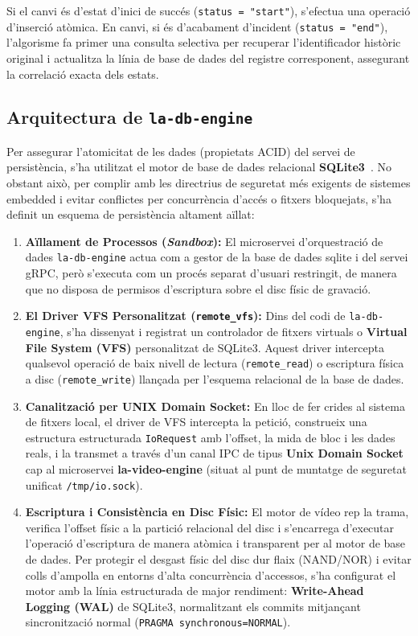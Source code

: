 Si el canvi és d'estat d'inici de succés (\texttt{status = "start"}), s'efectua una operació d'inserció atòmica. En canvi, si és d'acabament d'incident (\texttt{status = "end"}), l'algorisme fa primer una consulta selectiva per recuperar l'identificador històric original i actualitza la línia de base de dades del registre corresponent, assegurant la correlació exacta dels estats.

\subsection{Arquitectura de \texttt{la-db-engine}}
Per assegurar l'atomicitat de les dades (propietats ACID) del servei de persistència, s'ha utilitzat el motor de base de dades relacional \textbf{SQLite3}~\cite{sqlite_spec}. No obstant això, per complir amb les directrius de seguretat més exigents de sistemes embedded i evitar conflictes per concurrència d'accés o fitxers bloquejats, s'ha definit un esquema de persistència altament aïllat:

\begin{enumerate}
  \item \textbf{Aïllament de Processos (\textit{Sandbox}):} El microservei d'orquestració de dades \texttt{la-db-engine} actua com a gestor de la base de dades sqlite i del servei gRPC, però s'executa com un procés separat d'usuari restringit, de manera que no disposa de permisos d'escriptura sobre el disc físic de gravació.
  \item {\sloppy\textbf{El Driver VFS Personalitzat (\texttt{remote\_vfs}):} Dins del codi de \texttt{la-db-engine}, s'ha dissenyat i registrat un controlador de fitxers virtuals o \textbf{Virtual File System (VFS)} personalitzat de SQLite3. Aquest driver intercepta qualsevol operació de baix nivell de lectura (\texttt{remote\_read}) o escriptura física a disc (\texttt{remote\_write}) llançada per l'esquema relacional de la base de dades.\par}
  \item \textbf{Canalització per UNIX Domain Socket:} En lloc de fer crides al sistema de fitxers local, el driver de VFS intercepta la petició, construeix una estructura estructurada \texttt{IoRequest} amb l'offset, la mida de bloc i les dades reals, i la transmet a través d'un canal IPC de tipus \textbf{Unix Domain Socket} cap al microservei \textbf{la-video-engine} (situat al punt de muntatge de seguretat unificat \texttt{/tmp/io.sock}).
  \item \textbf{Escriptura i Consistència en Disc Físic:} El motor de vídeo rep la trama, verifica l'offset físic a la partició relacional del disc i s'encarrega d'executar l'operació d'escriptura de manera atòmica i transparent per al motor de base de dades. Per protegir el desgast físic del disc dur flaix (NAND/NOR) i evitar colls d'ampolla en entorns d'alta concurrència d'accessos, s'ha configurat el motor amb la línia estructurada de major rendiment: \textbf{Write-Ahead Logging (WAL)} de SQLite3, normalitzant els commits mitjançant sincronització normal (\texttt{PRAGMA synchronous=NORMAL}).
\end{enumerate}

